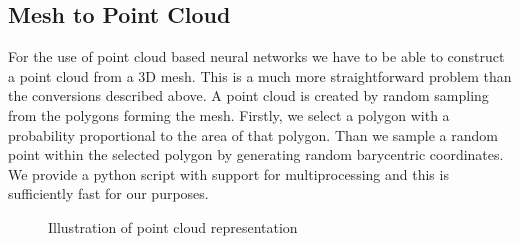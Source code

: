\subsection{Mesh to Point Cloud}
For the use of point cloud based neural networks we have to be able to construct a point cloud from a 3D mesh. This is a much more straightforward problem than the conversions described above. A point cloud is created by random sampling from the polygons forming the mesh. Firstly, we select a polygon with a probability proportional to the area of that polygon. Than we sample a random point within the selected polygon by generating random barycentric coordinates. We provide a python script with support for multiprocessing and this is sufficiently fast for our purposes.  

\begin{figure}[!h]
	\centering
	\qquad
	\caption{Illustration of point cloud representation}
\end{figure}

